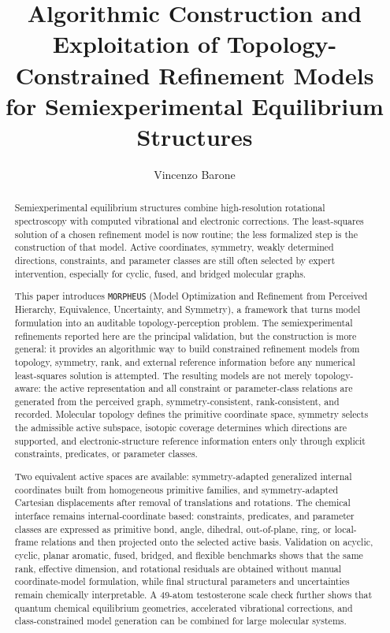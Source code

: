 \documentclass[aip,jcp,reprint,longbibliography,floatfix]{revtex4-2}
\begin{document}
\title{Algorithmic Construction and Exploitation of Topology-Constrained Refinement Models for Semiexperimental Equilibrium Structures}

\author{Vincenzo Barone}

\begin{abstract}

Semiexperimental equilibrium structures combine high-resolution rotational
spectroscopy with computed vibrational and electronic corrections. The
least-squares solution of a chosen refinement model is now routine; the less
formalized step is the construction of that model. Active coordinates,
symmetry, weakly determined directions, constraints, and parameter classes are
still often selected by expert intervention, especially for cyclic, fused, and
bridged molecular graphs.

This paper introduces \texttt{MORPHEUS} (Model Optimization and Refinement from
Perceived Hierarchy, Equivalence, Uncertainty, and Symmetry), a framework that
turns model formulation into an auditable topology-perception problem. The
semiexperimental refinements reported here are the principal validation, but
the construction is more general: it provides an algorithmic way to build
constrained refinement models from topology, symmetry, rank, and external
reference information before any numerical least-squares solution is attempted.
The resulting models are not merely topology-aware: the active representation and
all constraint or parameter-class relations are generated from the perceived
graph, symmetry-consistent, rank-consistent, and recorded. Molecular topology defines
the primitive coordinate space, symmetry selects the admissible active
subspace, isotopic coverage determines which directions are supported, and
electronic-structure reference information enters only through explicit
constraints, predicates, or parameter classes.

Two equivalent active spaces are available: symmetry-adapted generalized
internal coordinates built from homogeneous primitive families, and
symmetry-adapted Cartesian displacements after removal of translations and
rotations. The chemical interface remains internal-coordinate based:
constraints, predicates, and parameter classes are expressed as primitive
bond, angle, dihedral, out-of-plane, ring, or local-frame relations and then
projected onto the selected active basis. Validation on acyclic, cyclic,
planar aromatic, fused, bridged, and flexible benchmarks shows that the same
rank, effective dimension, and rotational residuals are obtained without
manual coordinate-model formulation, while final structural parameters and
uncertainties remain chemically interpretable. A 49-atom testosterone scale
check further shows that quantum chemical equilibrium geometries, accelerated
vibrational corrections, and class-constrained model generation can be combined
for large molecular systems.

\end{abstract}
\end{document}
